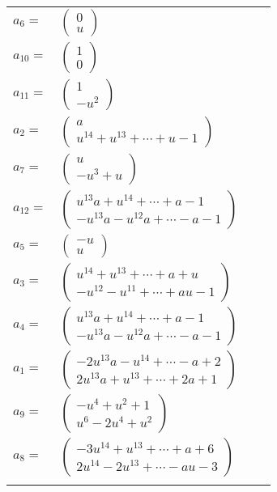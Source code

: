 \documentclass[1p]{elsarticle_modified}
\theoremstyle{definition}
\begin{document}
\begin{tabular}{m{7pt} m{180pt} m{7pt} m{180pt} }
\flushright $a_{6}=$&$\begin{pmatrix}0\\u\end{pmatrix}$ \\
\flushright $a_{10}=$&$\begin{pmatrix}1\\0\end{pmatrix}$ \\
\flushright $a_{11}=$&$\begin{pmatrix}1\\- u^2\end{pmatrix}$ \\
\flushright $a_{2}=$&$\begin{pmatrix}a\\u^{14}+u^{13}+\cdots+u-1\end{pmatrix}$ \\
\flushright $a_{7}=$&$\begin{pmatrix}u\\- u^3+u\end{pmatrix}$ \\
\flushright $a_{12}=$&$\begin{pmatrix}u^{13} a+u^{14}+\cdots+a-1\\- u^{13} a- u^{12} a+\cdots- a-1\end{pmatrix}$ \\
\flushright $a_{5}=$&$\begin{pmatrix}- u\\u\end{pmatrix}$ \\
\flushright $a_{3}=$&$\begin{pmatrix}u^{14}+u^{13}+\cdots+a+u\\- u^{12}- u^{11}+\cdots+a u-1\end{pmatrix}$ \\
\flushright $a_{4}=$&$\begin{pmatrix}u^{13} a+u^{14}+\cdots+a-1\\- u^{13} a- u^{12} a+\cdots- a-1\end{pmatrix}$ \\
\flushright $a_{1}=$&$\begin{pmatrix}-2 u^{13} a- u^{14}+\cdots- a+2\\2 u^{13} a+u^{13}+\cdots+2 a+1\end{pmatrix}$ \\
\flushright $a_{9}=$&$\begin{pmatrix}- u^4+u^2+1\\u^6-2 u^4+u^2\end{pmatrix}$ \\
\flushright $a_{8}=$&$\begin{pmatrix}-3 u^{14}+u^{13}+\cdots+a+6\\2 u^{14}-2 u^{13}+\cdots- a u-3\end{pmatrix}$\\&\end{tabular}
\end{document}
